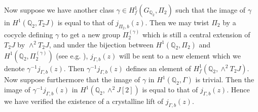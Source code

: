 \documentclass[11pt]{amsart}
\def\Z{\mathbb Z}
\def\Q{\mathbb Q}
\theoremstyle{plain}
\theoremstyle{definition}
\newcommand{\cris}{\mathrm{cris}}
\begin{document}
Now suppose we have another class $\gamma \in H^1 _f (G_{\Q _2 },\Pi _2 )$ such that the image of $\gamma $ in $H^1 (\Q _2 ,T_2 J)$ is equal to that of $j_{\Pi _2 ,b}(z)$. Then we may twist $\Pi _2 $ by a cocycle defining $\gamma$ to get a new group $\Pi _2 ^{(\gamma )}$ which is still a central extension of $T_2 J$ by $\wedge ^2 T_2 J$, and under the bijection between $H^1 (\Q _2 ,\Pi _2 )$ and $H^1 (\Q _2 ,\Pi _2 ^{(\gamma )})$ (see e.g. \cite[I.5.34]{serre-gc}), $j_{\Gamma ,b}(z)$ will be sent to a new element which we denote $\gamma ^{-1}j_{\Gamma ,b}(z)$. Then $\gamma ^{-1}j_{\Gamma ,b}(z)$ defines an element of $H^1 _f (\Q _2 ,\wedge ^2 T_2 J)$. Now suppose furthermore that the image of $\gamma $ in $H^1 (\Q _2 ,\Gamma )$ is trivial. Then the image of $\gamma ^{-1}j_{\Gamma ,b}(z)$ in $H^1 (\Q _2 ,\wedge ^2 J[2])$ is equal to that of $j_{\Gamma ,b}(z)$. Hence we have verified the existence of a crystalline lift of $j_{\Gamma ,b}(z)$.
%
\end{document}
